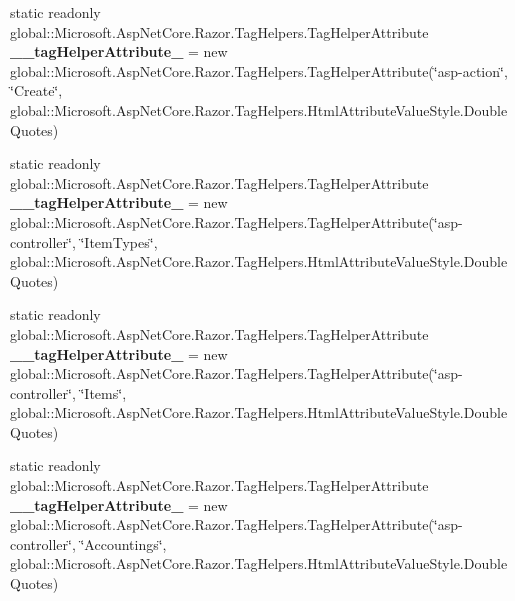\begin{DoxyCompactItemize}
\item 
\mbox{\label{class_asp_net_core_1_1_views___shared____sidebar_a362abdf3586f884e759a22498c1f1d1e}} 
static readonly global\+::\+Microsoft.\+Asp\+Net\+Core.\+Razor.\+Tag\+Helpers.\+Tag\+Helper\+Attribute {\bfseries \+\_\+\+\_\+tag\+Helper\+Attribute\+\_} = new global\+::\+Microsoft.\+Asp\+Net\+Core.\+Razor.\+Tag\+Helpers.\+Tag\+Helper\+Attribute(\char`\"{}asp-\/action\char`\"{}, \char`\"{}Create\char`\"{}, global\+::\+Microsoft.\+Asp\+Net\+Core.\+Razor.\+Tag\+Helpers.\+Html\+Attribute\+Value\+Style.\+Double\+Quotes)
\item 
\mbox{\label{class_asp_net_core_1_1_views___shared____sidebar_a0c8d90c402b4609c774aee9d015c9a82}} 
static readonly global\+::\+Microsoft.\+Asp\+Net\+Core.\+Razor.\+Tag\+Helpers.\+Tag\+Helper\+Attribute {\bfseries \+\_\+\+\_\+tag\+Helper\+Attribute\+\_} = new global\+::\+Microsoft.\+Asp\+Net\+Core.\+Razor.\+Tag\+Helpers.\+Tag\+Helper\+Attribute(\char`\"{}asp-\/controller\char`\"{}, \char`\"{}Item\+Types\char`\"{}, global\+::\+Microsoft.\+Asp\+Net\+Core.\+Razor.\+Tag\+Helpers.\+Html\+Attribute\+Value\+Style.\+Double\+Quotes)
\item 
\mbox{\label{class_asp_net_core_1_1_views___shared____sidebar_ab7e75892bd35ae8171875bb57dd08ad1}} 
static readonly global\+::\+Microsoft.\+Asp\+Net\+Core.\+Razor.\+Tag\+Helpers.\+Tag\+Helper\+Attribute {\bfseries \+\_\+\+\_\+tag\+Helper\+Attribute\+\_} = new global\+::\+Microsoft.\+Asp\+Net\+Core.\+Razor.\+Tag\+Helpers.\+Tag\+Helper\+Attribute(\char`\"{}asp-\/controller\char`\"{}, \char`\"{}Items\char`\"{}, global\+::\+Microsoft.\+Asp\+Net\+Core.\+Razor.\+Tag\+Helpers.\+Html\+Attribute\+Value\+Style.\+Double\+Quotes)
\item 
\mbox{\label{class_asp_net_core_1_1_views___shared____sidebar_abe02a409c3310e4bb4187147a6fb3346}} 
static readonly global\+::\+Microsoft.\+Asp\+Net\+Core.\+Razor.\+Tag\+Helpers.\+Tag\+Helper\+Attribute {\bfseries \+\_\+\+\_\+tag\+Helper\+Attribute\+\_} = new global\+::\+Microsoft.\+Asp\+Net\+Core.\+Razor.\+Tag\+Helpers.\+Tag\+Helper\+Attribute(\char`\"{}asp-\/controller\char`\"{}, \char`\"{}Accountings\char`\"{}, global\+::\+Microsoft.\+Asp\+Net\+Core.\+Razor.\+Tag\+Helpers.\+Html\+Attribute\+Value\+Style.\+Double\+Quotes)

\end{DoxyCompactItemize}
